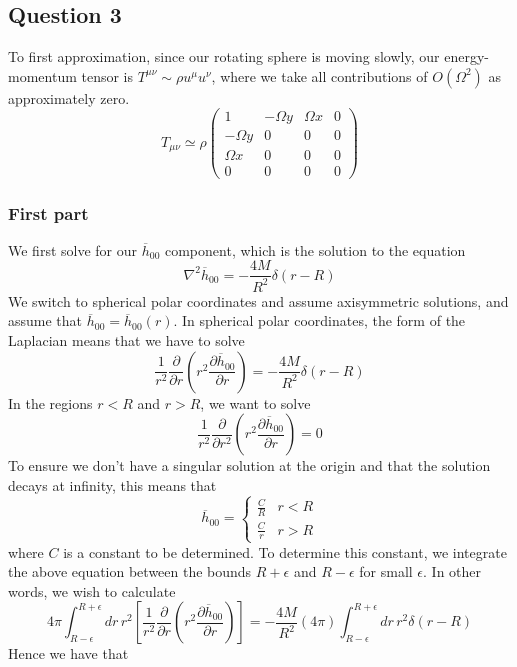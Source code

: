 \documentclass[11pt, a4paper]{article}   	%
\theoremstyle{slplain}
\begin{document}
\pagebreak 

\subsection{Question 3} 
To first approximation, since our rotating sphere is moving 
slowly, our energy-momentum tensor 
is $ T^{ \mu \nu } \sim \rho u ^{ \mu } u ^{ \nu } $, 
where we take all contributions of $ O \left(  \Omega ^ 2  \right)  $ 
as approximately zero. 
\[
T_{ \mu \nu } \simeq \rho 
\begin{pmatrix}  1 & - \Omega y & \Omega x & 0 
\\ - \Omega y & 0 & 0 & 0 
\\ \Omega x & 0 & 0 & 0 \\
0 & 0 & 0 & 0 \end{pmatrix} 
\] 
\subsubsection{First part}
We first solve for our $ \overline{ h } _{ 00 } $ component, 
which is the solution to the equation 
\[
\nabla ^ 2 \overline{ h } _{ 00 }  = - \frac{ 4 M }{ R ^ 2 } \delta \left( r - R  \right) 
\] We switch to spherical polar coordinates and 
assume axisymmetric solutions, and assume that 
$ \overline{ h } _{ 00 }  = \overline{ h } _{ 00 } \left( r  \right)  $. 
In spherical polar coordinates, 
the form of the Laplacian means that 
we have to solve
\[
\frac{1}{ r^ 2  } \frac{\partial }{\partial r }  \left( r ^ 2 
\frac{\partial  \overline{ h } _{ 00  } }{\partial r  }  \right) 
=  - \frac{4 M }{ R ^ 2 } \delta \left( r - R  \right) 
\] 
In the regions $ r < R $ and $ r > R $, we 
want to solve 
\[
\frac{1}{ r ^ 2 } \frac{\partial  }{\partial  r ^ 2 }  \left( 
r ^ 2 \frac{\partial  \overline{ h } _{ 00 } }{\partial   r }  \right) = 0  
\] To ensure we don't have a singular solution at the origin
and that the solution decays at infinity, this means that 
\[
\overline{ h} _{ 00 }  = \begin{cases}
\frac{C}{ R } & r < R  \\ 
\frac{C}{r} & r > R 
\end{cases}
\] where $ C $ is a constant to be determined. 
To determine this constant, we integrate the 
above equation between the bounds $ R + \epsilon $ and $ R  - \epsilon $ 
for small $ \epsilon $. In other words, 
we wish to calculate 
\[
4 \pi \int_{ R - \epsilon } ^{  R + \epsilon } 
dr \, r ^ 2 \left[ \frac{1}{ r ^ 2 } \frac{\partial  }{\partial  r }  
\left( r ^ 2 \frac{\partial  \overline{ h } _{ 00 } }{\partial  r }   \right)  \right]   = - \frac{4 M }{ R ^ 2 } \left( 4 \pi  \right)  
\int_{ R - \epsilon } ^{ R + \epsilon }  dr \, r ^ 2 \delta \left( r - R  \right)  
\] Hence we have that 
\end{document}

